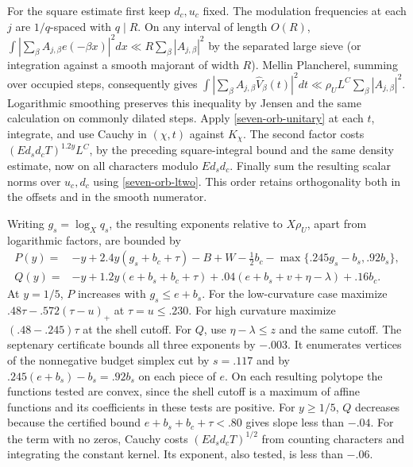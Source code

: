 \documentclass[11pt,a4paper]{article}
\theoremstyle{paperplain}
\numberwithin{equation}{section}
\begin{document}
For the square estimate first keep \(d_c,u_c\) fixed. The modulation
frequencies at each \(j\) are \(1/q\)-spaced with \(q\mid R\).
On any interval of length \(O(R)\),
\(\int|\sum_\beta A_{j,\beta}e(-\beta x)|^2dx
 \ll R\sum_\beta|A_{j,\beta}|^2\) by the separated large sieve
(or integration against a smooth majorant of width \(R\)).
Mellin Plancherel, summing over occupied steps, consequently gives
\(\int|\sum_\beta A_{j,\beta}\widehat V_\beta(t)|^2dt
 \ll \rho_U L^C\sum_\beta|A_{j,\beta}|^2\).
Logarithmic smoothing preserves this inequality by Jensen and the
same calculation on commonly dilated steps. Apply
\eqref{seven-orb-unitary} at each \(t\), integrate, and use
Cauchy in \((\chi,t)\) against \(K_\chi\).
The second factor costs
\((E d_s d_c T)^{1.2y}L^C\), by the preceding square-integral
bound and the same density estimate, now on all characters modulo
\(Ed_s d_c\). Finally sum the resulting scalar norms over \(u_c,d_c\)
using \eqref{seven-orb-ltwo}. This order retains orthogonality both
in the offsets and in the smooth numerator.

Writing \(g_s=\log_X q_s\), the resulting exponents relative to
\(X\rho_U\), apart from logarithmic factors, are bounded by
\begin{align*}
 P(y)={}&-y+2.4y(g_s+b_c+\tau)-B+W-\tfrac12 b_c
             -\max\{.245g_s-b_s,.92b_s\},\\
 Q(y)={}&-y+1.2y(e+b_s+b_c+\tau)
                    +.04(e+b_s+v+\eta-\lambda)+.16b_c .
\end{align*}
At \(y=1/5\), \(P\) increases with \(g_s\le e+b_s\).
For the low-curvature case maximize
\(.48\tau-.572(\tau-u)_+\) at \(\tau=u\le.230\).
For high curvature maximize \((.48-.245)\tau\) at the shell cutoff.
For \(Q\), use \(\eta-\lambda\le z\) and the same cutoff.
The septenary certificate  bounds
all three exponents by \(-.003\). It enumerates vertices of the
nonnegative budget simplex cut by \(s=.117\) and by
\(.245(e+b_s)-b_s=.92b_s\) on each piece of \(e\). On each resulting
polytope the functions tested are convex, since the shell cutoff is a
maximum of affine functions and its coefficients in these tests are
positive. For \(y\ge1/5\), \(Q\) decreases because the certified bound
\(e+b_s+b_c+\tau<.80\) gives slope less than \(-.04\).
For the term with no zeros, Cauchy costs
\((Ed_s d_cT)^{1/2}\) from counting characters and integrating the
constant kernel. Its exponent, also tested, is less than \(-.06\).
\end{document}

